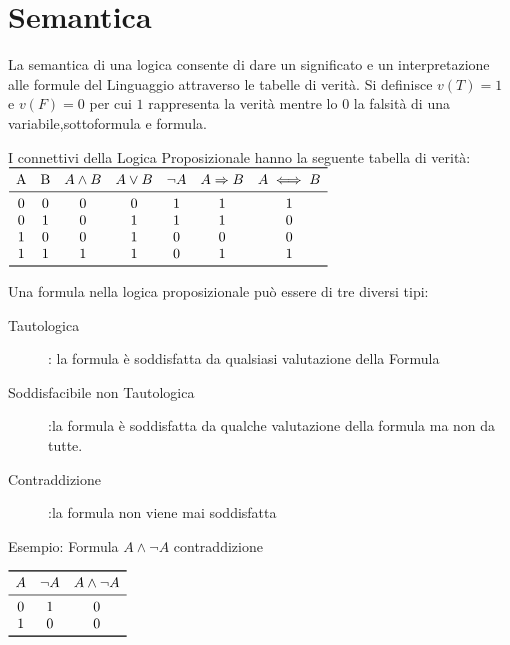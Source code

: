 \section{Semantica}
La semantica di una logica consente di dare un significato e un interpretazione
 alle formule del Linguaggio attraverso le tabelle di verità.\newline
Si definisce $v(T) = 1$ e $v(F) = 0$ per cui $1$ rappresenta la verità mentre lo $0$
la falsità di una variabile,sottoformula e formula.

I connettivi della Logica Proposizionale hanno la seguente tabella di verità:\newline
$\begin{array}{ccccccc}
\toprule
\text{A} & \text{B} & A \land B & A \lor B & \neg A & A \Rightarrow B & A \iff B \\
\midrule
    0 & 0 & 0 & 0 & 1 & 1 & 1 \\
    0 & 1 & 0 & 1 & 1 & 1 & 0 \\
    1 & 0 & 0 & 1 & 0 & 0 & 0 \\
    1 & 1 & 1 & 1 & 0 & 1 & 1 \\
\bottomrule
\end{array}$\newline

Una formula nella logica proposizionale può essere di tre diversi tipi:
\begin{description}
    \item[Tautologica]: la formula è soddisfatta da qualsiasi valutazione della Formula
    \item[Soddisfacibile non Tautologica]:la formula è soddisfatta da qualche valutazione
                        della formula ma non da tutte.
    \item[Contraddizione]:la formula non viene mai soddisfatta
\end{description}

Esempio:\newline
Formula $A \land \neg A$ \quad contraddizione

$\begin{array}{ccc}
\toprule A & \neg A & A \land \neg A \\
\midrule
        0 & 1 & 0 \\
        1 & 0 & 0 \\
\bottomrule
\end{array}$\newpage


